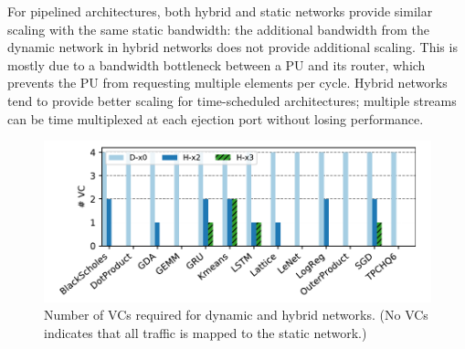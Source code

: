 For pipelined architectures, both hybrid and static networks provide similar scaling with the same static bandwidth:
the additional bandwidth from the dynamic network in hybrid networks does not provide additional scaling. 
This is mostly due to a bandwidth bottleneck between a PU and its router, which prevents the PU from requesting multiple elements per cycle.
Hybrid networks tend to provide better scaling for time-scheduled architectures; multiple streams can be time multiplexed at each ejection port without losing performance.

\begin{figure}
\centering
\includegraphics[width=1\columnwidth]{network/figs/vc.pdf}
  \caption{Number of VCs required for dynamic and hybrid networks. (No VCs indicates that all traffic is mapped to the static network.)}\label{fig:vc}
\end{figure}

